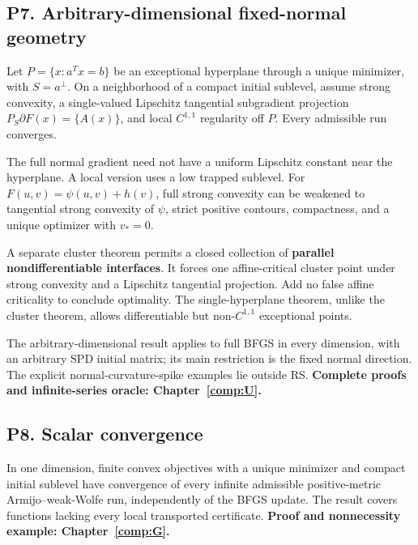 

\subsection{P7. Arbitrary-dimensional fixed-normal geometry}\label{p7.-arbitrary-dimensional-fixed-normal-geometry}

Let \(P=\{x:a^Tx=b\}\) be an exceptional hyperplane through a unique minimizer, with \(S=a^\perp\). On a neighborhood of a compact initial sublevel, assume strong convexity, a single-valued Lipschitz tangential subgradient projection \(P_S\partial F(x)=\{A(x)\}\), and local \(C^{1,1}\) regularity off \(P\). Every admissible run converges.

The full normal gradient need not have a uniform Lipschitz constant near the hyperplane. A local version uses a low trapped sublevel. For \(F(u,v)=\psi(u,v)+h(v)\), full strong convexity can be weakened to tangential strong convexity of \(\psi\), strict positive contours, compactness, and a unique optimizer with \(v_*=0\).

A separate cluster theorem permits a closed collection of \textbf{parallel nondifferentiable interfaces}. It forces one affine-critical cluster point under strong convexity and a Lipschitz tangential projection. Add no false affine criticality to conclude optimality. The single-hyperplane theorem, unlike the cluster theorem, allows differentiable but non-\(C^{1,1}\) exceptional points.

The arbitrary-dimensional result applies to full BFGS in every dimension, with an arbitrary SPD initial matrix; its main restriction is the fixed normal direction. The explicit normal-curvature-spike examples lie outside RS. \textbf{Complete proofs and infinite-series oracle: Chapter~\ref{comp:U}.}



\subsection{P8. Scalar convergence}\label{p8.-scalar-convergence}

In one dimension, finite convex objectives with a unique minimizer and compact initial sublevel have convergence of every infinite admissible positive-metric Armijo--weak-Wolfe run, independently of the BFGS update. The result covers functions lacking every local transported certificate. \textbf{Proof and nonnecessity example: Chapter~\ref{comp:G}.}


